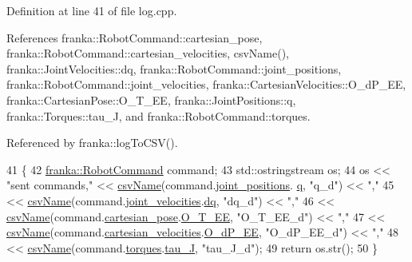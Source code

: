 Definition at line 41 of file log.\+cpp.



References franka\+::\+Robot\+Command\+::cartesian\+\_\+pose, franka\+::\+Robot\+Command\+::cartesian\+\_\+velocities, csv\+Name(), franka\+::\+Joint\+Velocities\+::dq, franka\+::\+Robot\+Command\+::joint\+\_\+positions, franka\+::\+Robot\+Command\+::joint\+\_\+velocities, franka\+::\+Cartesian\+Velocities\+::\+O\+\_\+d\+P\+\_\+\+EE, franka\+::\+Cartesian\+Pose\+::\+O\+\_\+\+T\+\_\+\+EE, franka\+::\+Joint\+Positions\+::q, franka\+::\+Torques\+::tau\+\_\+J, and franka\+::\+Robot\+Command\+::torques.



Referenced by franka\+::log\+To\+C\+S\+V().


\begin{DoxyCode}
41                                   \{
42   \hyperlink{structfranka_1_1RobotCommand}{franka::RobotCommand} command;
43   std::ostringstream os;
44   os << \textcolor{stringliteral}{"sent commands,"} << \hyperlink{namespacefranka_1_1anonymous__namespace_02log_8cpp_03_afa84e09d4799d45ad094a8e4c2ad4c72}{csvName}(command.\hyperlink{structfranka_1_1RobotCommand_a086afcec596eae5284b6c39dc1452280}{joint\_positions}.
      \hyperlink{classfranka_1_1JointPositions_a40e9098abe1c51cd48e17e41fbf78337}{q}, \textcolor{stringliteral}{"q\_d"}) << \textcolor{stringliteral}{","}
45      << \hyperlink{namespacefranka_1_1anonymous__namespace_02log_8cpp_03_afa84e09d4799d45ad094a8e4c2ad4c72}{csvName}(command.\hyperlink{structfranka_1_1RobotCommand_a049657cf2bbbb53d6ffa5581721e7b71}{joint\_velocities}.\hyperlink{classfranka_1_1JointVelocities_a14fddb6fe7a7c4034dc82c283de8c2d3}{dq}, \textcolor{stringliteral}{"dq\_d"}) << \textcolor{stringliteral}{","}
46      << \hyperlink{namespacefranka_1_1anonymous__namespace_02log_8cpp_03_afa84e09d4799d45ad094a8e4c2ad4c72}{csvName}(command.\hyperlink{structfranka_1_1RobotCommand_acce2090d696ebb9759fd0f37fd35a298}{cartesian\_pose}.\hyperlink{classfranka_1_1CartesianPose_a406e53e3d8fe594a11888f516eb4bf7d}{O\_T\_EE}, \textcolor{stringliteral}{"O\_T\_EE\_d"}) << \textcolor{stringliteral}{","}
47      << \hyperlink{namespacefranka_1_1anonymous__namespace_02log_8cpp_03_afa84e09d4799d45ad094a8e4c2ad4c72}{csvName}(command.\hyperlink{structfranka_1_1RobotCommand_a04b4841130fab920936190be1bc5dba3}{cartesian\_velocities}.\hyperlink{classfranka_1_1CartesianVelocities_ab7a42c7c1ee7109025aff5c43a56b398}{O\_dP\_EE}, \textcolor{stringliteral}{"O\_dP\_EE\_d"}) << \textcolor{stringliteral}{","}
48      << \hyperlink{namespacefranka_1_1anonymous__namespace_02log_8cpp_03_afa84e09d4799d45ad094a8e4c2ad4c72}{csvName}(command.\hyperlink{structfranka_1_1RobotCommand_a8b23e8b669b1fd594988ecdbf54bfbce}{torques}.\hyperlink{classfranka_1_1Torques_ac2a266cc2d3b7e0fb4f8eff045dbaed8}{tau\_J}, \textcolor{stringliteral}{"tau\_J\_d"});
49   \textcolor{keywordflow}{return} os.str();
50 \}
\end{DoxyCode}
